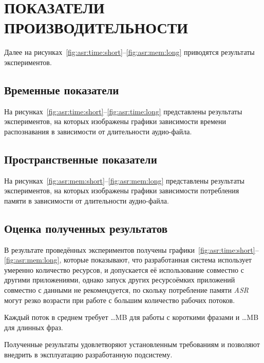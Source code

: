 \chapter{ПОКАЗАТЕЛИ ПРОИЗВОДИТЕЛЬНОСТИ}

Далее на рисунках~\ref{fig:asr:time:short}--\ref{fig:asr:mem:long} приводятся
результаты экспериментов.

\section{Временные показатели}
На рисунках~\ref{fig:asr:time:short}--\ref{fig:asr:time:long} представлены
результаты экспериментов, на которых изображены графики зависимости времени
распознавания в зависимости от длительности аудио-файла.

\newpage
\section{Пространственные показатели}
На рисунках~\ref{fig:asr:mem:short}--\ref{fig:asr:mem:long} представлены
результаты экспериментов, на которых изображены графики зависимости потребления
памяти в зависимости от длительности аудио-файла.


\section{Оценка полученных результатов}
В результате проведённых экспериментов получены графики~\ref{fig:asr:time:short}--\ref{fig:asr:mem:long},
которые показывают, что разработанная система использует умеренно количество
ресурсов, и допускается её использование совместно с другими приложениями,
однако запуск других ресурсоёмких приложений совместно с данными не рекомендуется,
по скольку потребление памяти \textit{ASR} могут резко возрасти при работе
с большим количество рабочих потоков.

Каждый поток в среднем требует \dots MB для работы с короткими фразами и
\dots MB для длинных фраз.

Полученные результаты удовлетворяют установленным требованиям и позволяют
внедрить в эксплуатацию разработанную подсистему.
